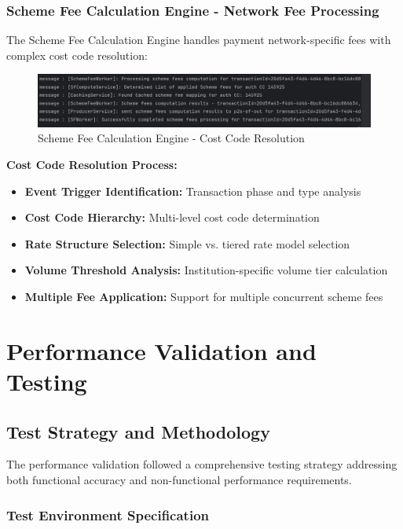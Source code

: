 \subsubsection{Scheme Fee Calculation Engine - Network Fee Processing}

The Scheme Fee Calculation Engine handles payment network-specific fees with complex cost code resolution:

\begin{figure}[h]
    \centering
    \includegraphics[width=1\textwidth]{img/impl/sfcompute.png}
    \caption{Scheme Fee Calculation Engine - Cost Code Resolution}
    \label{fig:processing-flow-sf}
\end{figure}

\textbf{Cost Code Resolution Process:}
\begin{itemize}
    \item \textbf{Event Trigger Identification:} Transaction phase and type analysis
    \item \textbf{Cost Code Hierarchy:} Multi-level cost code determination
    \item \textbf{Rate Structure Selection:} Simple vs. tiered rate model selection
    \item \textbf{Volume Threshold Analysis:} Institution-specific volume tier calculation
    \item \textbf{Multiple Fee Application:} Support for multiple concurrent scheme fees
\end{itemize}

\section{Performance Validation and Testing}

\subsection{Test Strategy and Methodology}

The performance validation followed a comprehensive testing strategy addressing both functional accuracy and non-functional performance requirements.

\subsubsection{Test Environment Specification}

